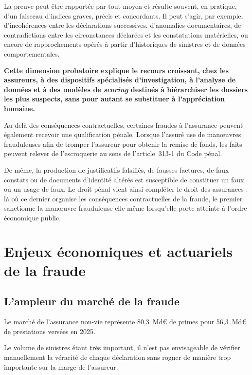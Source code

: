 La preuve peut être rapportée par tout moyen et résulte souvent, en pratique, d'un faisceau d'indices graves, précis et concordants. Il peut s'agir, par exemple, d'incohérences entre les déclarations successives, d'anomalies documentaires, de contradictions entre les circonstances déclarées et les constatations matérielles, ou encore de rapprochements opérés à partir d'historiques de sinistres et de données comportementales.

\textbf{Cette dimension probatoire explique le recours croissant, chez les assureurs, à des dispositifs spécialisés d'investigation, à l'analyse de données et à des modèles de \textit{scoring} destinés à hiérarchiser les dossiers les plus suspects, sans pour autant se substituer à l'appréciation humaine.}

Au-delà des conséquences contractuelles, certaines fraudes à l'assurance peuvent également recevoir une qualification pénale. Lorsque l'assuré use de manœuvres frauduleuses afin de tromper l'assureur pour obtenir la remise de fonds, les faits peuvent relever de l'escroquerie au sens de l'article~313-1 du Code pénal.

De même, la production de justificatifs falsifiés, de fausses factures, de faux constats ou de documents d'identité altérés est susceptible de constituer un faux ou un usage de faux. Le droit pénal vient ainsi compléter le droit des assurances : là où ce dernier organise les conséquences contractuelles de la fraude, le premier sanctionne la manœuvre frauduleuse elle-même lorsqu'elle porte atteinte à l'ordre économique public.

\section{Enjeux économiques et actuariels de la fraude}

\subsection{L'ampleur du marché de la fraude}

Le marché de l'assurance non-vie représente 80,3~Md\euro{} de primes pour 56,3~Md\euro{} de prestations versées en 2025.

Le volume de sinistres étant très important, il n'est pas envisageable de vérifier manuellement la véracité de chaque déclaration sans rogner de manière trop importante sur la marge de l'assureur.

